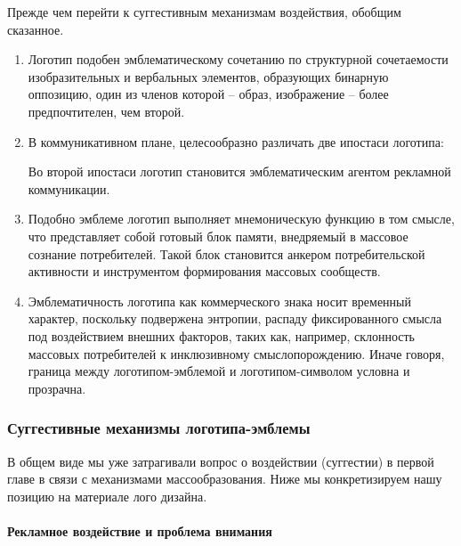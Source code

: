 Прежде чем перейти к  суггестивным механизмам воздействия, обобщим сказанное.
\begin{enumerate}
\item Логотип подобен эмблематическому сочетанию по структурной сочетаемости
  изобразительных и вербальных элементов, образующих бинарную оппозицию,
  один из членов которой -- образ, изображение -- более предпочтителен, чем второй.
\item В коммуникативном плане, целесообразно различать две ипостаси логотипа:
  Во второй ипостаси логотип становится эмблематическим агентом рекламной
  коммуникации.
\item Подобно эмблеме логотип выполняет мнемоническую функцию в том смысле,
  что представляет собой  готовый блок памяти, внедряемый в массовое сознание
  потребителей. Такой блок становится анкером потребительской активности и
  инструментом формирования массовых сообществ.
 \item Эмблематичность логотипа как коммерческого знака носит временный
  характер, поскольку подвержена энтропии, распаду фиксированного смысла под
  воздействием внешних факторов, таких как, например, склонность массовых
  потребителей к инклюзивному смыслопорождению. Иначе говоря, граница между
  логотипом-эмблемой и логотипом-символом условна и прозрачна.
\end{enumerate}

\subsubsection{Суггестивные механизмы логотипа-эмблемы}

В общем виде мы уже затрагивали вопрос о воздействии (суггестии) в первой главе
в связи с механизмами массообразования. Ниже мы конкретизируем нашу позицию
на материале лого дизайна.

\paragraph{Рекламное воздействие и  проблема внимания}

